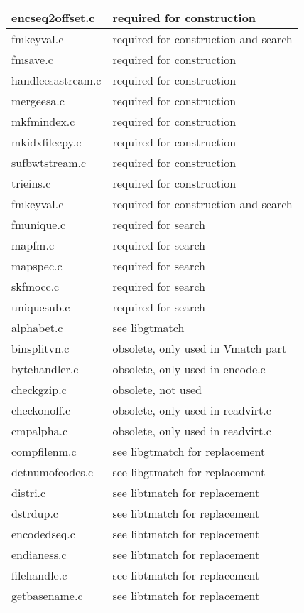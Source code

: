 \documentclass[11pt]{article}
\begin{document}
\begin{tabular}{|l|l|}\hline
encseq2offset.c & required for construction\\\hline
fmkeyval.c & required for construction and search\\\hline
fmsave.c & required for construction\\\hline
handleesastream.c & required for construction\\\hline
mergeesa.c & required for construction\\\hline
mkfmindex.c & required for construction\\\hline
mkidxfilecpy.c & required for construction\\\hline
sufbwtstream.c & required for construction\\\hline
trieins.c & required for construction\\\hline
fmkeyval.c & required for construction and search\\\hline\hline
fmunique.c & required for search\\\hline
mapfm.c & required for search\\\hline
mapspec.c & required for search\\\hline
skfmocc.c & required for search\\\hline
uniquesub.c & required for search\\\hline\hline
alphabet.c & see libgtmatch\\\hline
binsplitvn.c & obsolete, only used in Vmatch part\\\hline
bytehandler.c & obsolete, only used in encode.c\\\hline
checkgzip.c & obsolete, not used \\\hline
checkonoff.c & obsolete, only used in readvirt.c\\\hline
cmpalpha.c & obsolete, only used in readvirt.c\\\hline
compfilenm.c & see libgtmatch for replacement\\\hline
detnumofcodes.c& see libgtmatch for replacement\\\hline
distri.c & see libtmatch for replacement\\\hline
dstrdup.c & see libtmatch for replacement\\\hline
encodedseq.c & see libtmatch for replacement\\\hline
endianess.c &  see libtmatch for replacement\\\hline
filehandle.c &   see libtmatch for replacement\\\hline
getbasename.c & see libtmatch for replacement\\\hline

\end{tabular}
\end{document}
